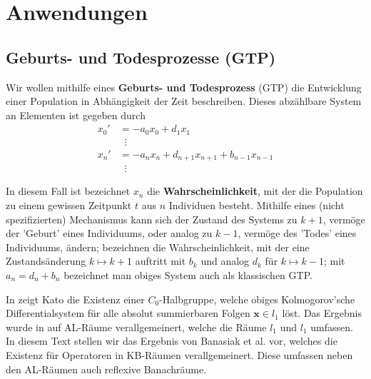 \chapter{Anwendungen}

\section{Geburts- und Todesprozesse (GTP)}

\par
Wir wollen mithilfe eines \textbf{Geburts- und Todesprozess} (GTP)
die Entwicklung einer Population in Abhängigkeit der Zeit beschreiben. Dieses abzählbare System an Elementen ist gegeben durch
\begin{align*}
x_0' &= -a_0x_0 + d_1 x_1\\
&\;\;\vdots\\
x_n' &= -a_nx_n + d_{n+1}x_{n+1} + b_{n-1}x_{n-1}  \\
&\;\;\vdots
\end{align*}

\par 
In diesem Fall ist bezeichnet $x_n$ die \textbf{Wahrscheinlichkeit}, mit der die Population zu einem gewissen Zeitpunkt $t$ aus $n$ Individuen besteht. Mithilfe eines (nicht spezifizierten) Mechanismus kann sich der Zustand des Systems zu $k+1$, vermöge der 'Geburt' eines Individuums, oder analog zu $k-1$, vermöge des 'Todes' eines Individuums, ändern; bezeichnen die Wahrscheinlichkeit, mit der eine Zustandsänderung $k\mapsto k+1$ auftritt mit  $b_k$ und analog $d_k$ für $k\mapsto k-1$; mit $a_n=d_n+b_n$ bezeichnet man obiges System auch als klassischen GTP.

In \cite{kato_1954} zeigt Kato die Existenz einer $C_0$-Halbgruppe, welche obiges Kolmogorov'sche Differentialsystem für alle absolut summierbaren Folgen $\textbf{x}\in l_1$ löst. Das Ergebnis wurde  in \cite{} auf AL-Räume verallgemeinert, welche die Räume $l_1$ und $l_1$ umfassen. In diesem Text stellen wir das Ergebnis von Banasiak et al.  \cite{banasiak_lachowicz_2007} vor, welches die Existenz für Operatoren in KB-Räumen verallgemeinert. Diese umfassen neben den AL-Räumen auch reflexive Banachräume. 




